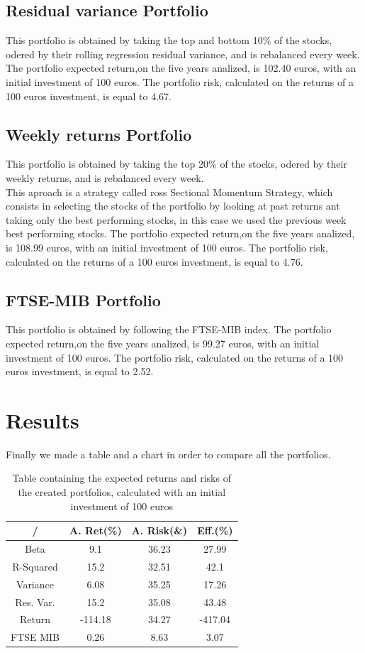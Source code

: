\documentclass[12pt, a4paper, twocolumn]{article} %
\begin{document}
	\subsection{Residual variance Portfolio}
	This portfolio is obtained by taking the top and bottom 10\% of the stocks, odered by their rolling regression residual variance, and is rebalanced every week.\\
	The portfolio expected return,on the five years analized, is 102.40 euros, with an initial investment of 100 euros. The portfolio risk, calculated on the returns of a 100 euros investment, is equal to 4.67.
	\subsection{Weekly returns Portfolio}
	This portfolio is obtained by taking the top 20\% of the stocks, odered by their weekly returns, and is rebalanced every week.\\
	This aproach is a strategy called ross Sectional Momentum Strategy, which consists in selecting the stocks of the portfolio by looking at past returns ant taking only the best performing stocks, in this case we used the previous week best performing stocks.
	The portfolio expected return,on the five years analized, is 108.99 euros, with an initial investment of 100 euros. The portfolio risk, calculated on the returns of a 100 euros investment, is equal to 4.76.
	\subsection{FTSE-MIB Portfolio}
	This portfolio is obtained by following the FTSE-MIB index.
	The portfolio expected return,on the five years analized, is 99.27 euros, with an initial investment of 100 euros. The portfolio risk, calculated on the returns of a 100 euros investment, is equal to 2.52.
	
	\section{Results}
		Finally we made a table and a chart in order to compare all the portfolios.
	\begin{table}[H]
		\centering
		\caption{Table containing the expected returns and risks of the created portfolios, calculated with an initial investment of 100 euros}
		\begin{tabular}{cccc} %
			\hline
			/ & A. Ret(\%) & A. Risk(\&) & Eff.(\%)\\
			\hline
			Beta 			& 9.1 			& 36.23 & 27.99\\
			R-Squared & 15.2 		& 32.51 & 42.1\\
			Variance 	& 6.08 		& 35.25 & 17.26\\
			Res. Var. & 15.2		& 35.08 & 43.48\\
			Return 		& -114.18 & 34.27 & -417.04\\
			FTSE MIB 	& 0.26 		& 8.63 	& 3.07\\
		
			\hline
		\end{tabular}
	\end{table}
\end{document}

